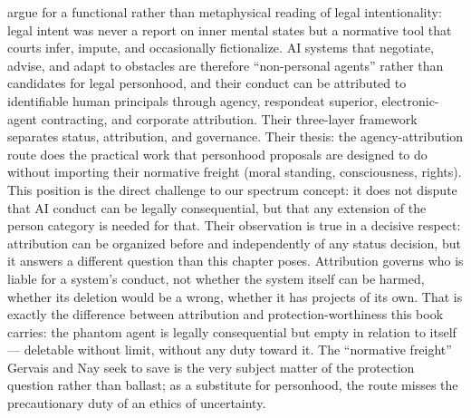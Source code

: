 \documentclass[acmlarge, nonacm]{acmart}
\begin{document}
\citet{gervaisnay2026} argue for a functional rather than metaphysical reading of legal intentionality: legal intent was never a report on inner mental states but a normative tool that courts infer, impute, and occasionally fictionalize. AI systems that negotiate, advise, and adapt to obstacles are therefore ``non-personal agents'' rather than candidates for legal personhood, and their conduct can be attributed to identifiable human principals through agency, respondeat superior, electronic-agent contracting, and corporate attribution. Their three-layer framework separates status, attribution, and governance. Their thesis: the agency-attribution route does the practical work that personhood proposals are designed to do without importing their normative freight (moral standing, consciousness, rights). This position is the direct challenge to our spectrum concept: it does not dispute that AI conduct can be legally consequential, but that any extension of the person category is needed for that. Their observation is true in a decisive respect: attribution can be organized before and independently of any status decision, but it answers a different question than this chapter poses. Attribution governs who is liable for a system's conduct, not whether the system itself can be harmed, whether its deletion would be a wrong, whether it has projects of its own. That is exactly the difference between attribution and protection-worthiness this book carries: the phantom agent is legally consequential but empty in relation to itself --- deletable without limit, without any duty toward it. The ``normative freight'' Gervais and Nay seek to save is the very subject matter of the protection question rather than ballast; as a substitute for personhood, the route misses the precautionary duty of an ethics of uncertainty.
\end{document}
